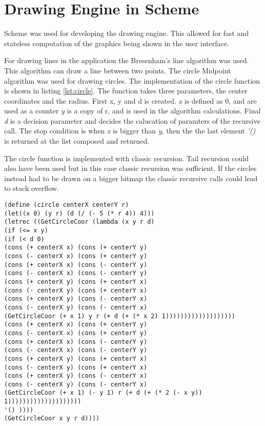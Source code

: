 \section{Drawing Engine in Scheme}
Scheme was used for developing the drawing engine. This allowed for fast and stateless computation of the graphics being shown in the user interface. 

For drawing lines in the application the Bresenham’s line algorithm was used. This algorithm can draw a line between two points. The circle Midpoint algorithm was used for drawing circles. The implementation of the circle function is shown in listing \ref{lst:circle}. The function takes three parameters, the center coordinates and the radius. First x, y and d is created. \emph{x} is defined as 0, and are used as a counter \emph{y} is a copy of r, and is used in the algorithm calculations. Final \emph{d} is  a decision parameter and decides the calucation of paramters of the recursive call. The stop condition is when \emph{x} is bigger than \emph{y}, then the the last element \emph{'()} is returned at the list composed and returned.

The circle function is implemented with classic recursion. Tail recursion could also have been used but in this case classic recursion was sufficient. If the circles instead had to be drawn on a bigger bitmap the classic recursive calls could lead to stack overflow.


\begin{lstlisting}[caption={Scheme function circle}, label=lst:circle]
(define (circle centerX centerY r)
(let((x 0) (y r) (d (/ (- 5 (* r 4)) 4)))
(letrec ((GetCircleCoor (lambda (x y r d)
(if (<= x y)
(if (< d 0)    
(cons (+ centerX x) (cons (+ centerY y)                                                
(cons (- centerX x) (cons (+ centerY y)
(cons (+ centerX x) (cons (- centerY y)         
(cons (- centerX x) (cons (- centerY y)
(cons (+ centerX y) (cons (+ centerY x)
(cons (- centerX y) (cons (+ centerY x)
(cons (+ centerX y) (cons (- centerY x)
(cons (- centerX y) (cons (- centerY x)  
(GetCircleCoor (+ x 1) y r (+ d (+ (* x 2) 1)))))))))))))))))))
(cons (+ centerX x) (cons (+ centerY y)                                                
(cons (- centerX x) (cons (+ centerY y)
(cons (+ centerX x) (cons (- centerY y)         
(cons (- centerX x) (cons (- centerY y)
(cons (+ centerX y) (cons (+ centerY x)
(cons (- centerX y) (cons (+ centerY x)
(cons (+ centerX y) (cons (- centerY x)
(cons (- centerX y) (cons (- centerY x)  
(GetCircleCoor (+ x 1) (- y 1) r (+ d (+ (* 2 (- x y)) 1))))))))))))))))))))
'() ))))
(GetCircleCoor x y r d))))   
\end{lstlisting}

